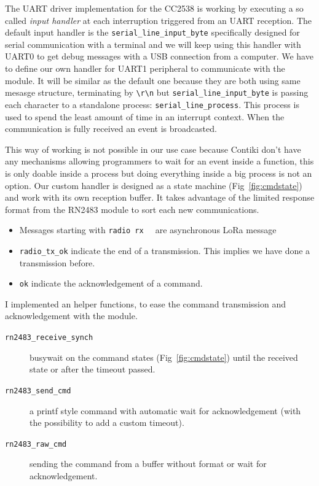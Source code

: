 The UART driver implementation for the CC2538 is working by executing a 
so called \emph{input handler} at each interruption triggered from an 
UART reception.
The default input handler is the \lstinline{serial_line_input_byte} 
specifically designed for serial communication with a terminal and we will keep
using this handler with UART0 to get debug messages with a USB connection from 
a computer.
We have to define our own handler for UART1 peripheral to communicate with the
module.
It will be similar as the default one because they are both using same mesasge
structure, terminating by \lstinline{\r\n} but 
\lstinline{serial_line_input_byte} is passing each character to a standalone
process: \lstinline{serial_line_process}.
This process is used to spend the least amount of time in an interrupt context. 
When the communication is fully received an event is broadcasted.

This way of working is not possible in our use case because Contiki don't have 
any mechanisms allowing programmers to wait for an event inside a function, 
this is only doable inside a process but doing everything inside a big process
is not an option.
Our custom handler is designed as a state machine (Fig~\ref{fig:cmdstate}) and 
work with its own reception buffer. It takes advantage of the limited response 
format from the RN2483 module to sort each new communications.

\begin{itemize}
  \item Messages starting with \lstinline{radio rx  } are asynchronous LoRa
    message
  \item \lstinline{radio_tx_ok} indicate the end of a transmission. This
    implies we have done a transmission before.
  \item \lstinline{ok} indicate the acknowledgement of a command.
\end{itemize}


I implemented an helper functions, to ease the command transmission and
acknowledgement with the module.

\begin{description}
  \item[\lstinline{rn2483_receive_synch}] busywait on the command states
    (Fig~\ref{fig:cmdstate}) until the received state or after the timeout
    passed.
  \item[\lstinline{rn2483_send_cmd}] a printf style command with automatic wait
    for acknowledgement (with the possibility to add a custom timeout).
  \item[\lstinline{rn2483_raw_cmd}] sending the command from a buffer without
    format or wait for acknowledgement.
\end{description}

